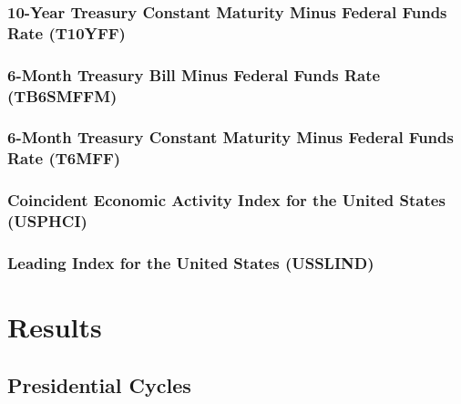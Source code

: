 \documentclass[]{book}
\begin{document}
\hypertarget{year-treasury-constant-maturity-minus-federal-funds-rate-t10yff}{%
\subsection{10-Year Treasury Constant Maturity Minus Federal Funds Rate (T10YFF)}\label{year-treasury-constant-maturity-minus-federal-funds-rate-t10yff}}

\hypertarget{month-treasury-bill-minus-federal-funds-rate-tb6smffm}{%
\subsection{6-Month Treasury Bill Minus Federal Funds Rate (TB6SMFFM)}\label{month-treasury-bill-minus-federal-funds-rate-tb6smffm}}

\hypertarget{month-treasury-constant-maturity-minus-federal-funds-rate-t6mff}{%
\subsection{6-Month Treasury Constant Maturity Minus Federal Funds Rate (T6MFF)}\label{month-treasury-constant-maturity-minus-federal-funds-rate-t6mff}}

\hypertarget{coincident-economic-activity-index-for-the-united-states-usphci}{%
\subsection{Coincident Economic Activity Index for the United States (USPHCI)}\label{coincident-economic-activity-index-for-the-united-states-usphci}}

\hypertarget{leading-index-for-the-united-states-usslind}{%
\subsection{Leading Index for the United States (USSLIND)}\label{leading-index-for-the-united-states-usslind}}

\hypertarget{results}{%
\chapter{Results}\label{results}}

\hypertarget{presidential-cycles-1}{%
\section{Presidential Cycles}\label{presidential-cycles-1}}
\end{document}
